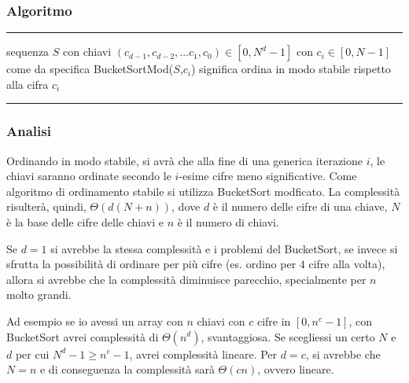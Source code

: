\documentclass[a4paper]{article}
\makeatletter
\newenvironment{algo}[4]{
	\noindent\rule{\textwidth}{0.4pt}
	\begin{algorithmic}[1]
		\addtocounter{ALG@line}{-1}
		\Procedure{#1}{#2}
		\Require #3
		\Ensure #4
		\Statex }{
		\EndProcedure
	\end{algorithmic}
	\rule{\textwidth}{0.4pt}}
\makeatother
\begin{document}
\subsubsection*{Algoritmo}
\begin{algo}{RadixSort}{$S$}{sequenza $S$ con chiavi \((c_{d-1}, c_{d-2}, \dots c_1, c_0) \in [0,N^d-1]\) con \(c_i \in [0,N-1]\)}{come da specifica}
		\State BucketSortMod(\(S\),\(c_i\)) \Comment significa ordina in modo stabile rispetto alla cifra \(c_i\)
	\EndFor
\end{algo}

\subsubsection*{Analisi}
Ordinando in modo stabile, si avrà che alla fine di una generica iterazione \(i\), le chiavi saranno ordinate secondo le \(i\)-esime
cifre meno significative. Come algoritmo di ordinamento stabile si utilizza BucketSort modficato. La complessità risulterà, quindi,
\(\Theta(d(N+n))\), dove \(d\) è il numero delle cifre di una chiave, \(N\) è la base delle cifre delle chiavi e \(n\) è il numero
di chiavi.

Se \(d = 1\) si avrebbe la stessa complessità e i problemi del BucketSort, se invece si sfrutta la possibilità di ordinare per più
cifre (es. ordino per \(4\) cifre alla volta), allora si avrebbe che la complessità diminuisce parecchio, specialmente per \(n\)
molto grandi.

Ad esempio se io avessi un array con \(n\) chiavi con \(c\) cifre in \([0,n^c-1]\), con BucketSort avrei complessità di
\(\Theta(n^d)\), svantaggiosa. Se scegliessi un certo \(N\) e \(d\) per cui \(N^d-1 \geq n^c-1\), avrei complessità lineare.
Per \(d = c\), si avrebbe che \(N = n\) e di conseguenza la complessità sarà \(\Theta(c n)\), ovvero lineare.
\end{document}
